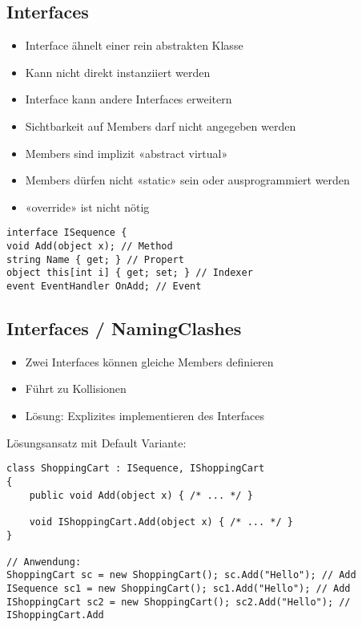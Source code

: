 \subsection{Interfaces}
\begin{itemize}
    \item Interface ähnelt einer rein abstrakten Klasse
    \item Kann nicht direkt instanziiert werden
    \item Interface kann andere Interfaces erweitern
    \item Sichtbarkeit auf Members darf nicht angegeben werden
    \item Members sind implizit «abstract virtual»
    \item Members dürfen nicht «static» sein oder ausprogrammiert werden
    \item «override» ist nicht nötig
\end{itemize}
\begin{lstlisting}
interface ISequence {
void Add(object x); // Method
string Name { get; } // Propert
object this[int i] { get; set; } // Indexer
event EventHandler OnAdd; // Event
\end{lstlisting}


\subsection{Interfaces / NamingClashes}
\begin{itemize}
    \item Zwei Interfaces können gleiche Members definieren
    \item Führt zu Kollisionen
    \item Lösung: Explizites implementieren des Interfaces
\end{itemize}

Lösungsansatz mit Default Variante:
\begin{lstlisting}
class ShoppingCart : ISequence, IShoppingCart
{
    public void Add(object x) { /* ... */ }

    void IShoppingCart.Add(object x) { /* ... */ }
}

// Anwendung:
ShoppingCart sc = new ShoppingCart(); sc.Add("Hello"); // Add
ISequence sc1 = new ShoppingCart(); sc1.Add("Hello"); // Add
IShoppingCart sc2 = new ShoppingCart(); sc2.Add("Hello"); // IShoppingCart.Add
\end{lstlisting}

\newpage